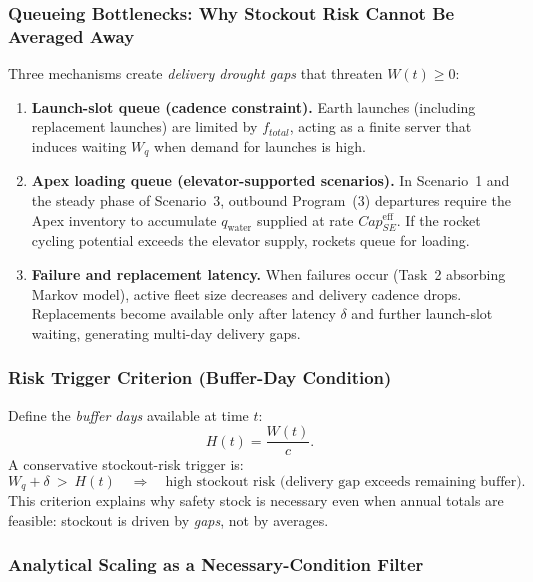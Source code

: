 ﻿\documentclass{mcmthesis}
\begin{document}
\subsubsection{Queueing Bottlenecks: Why Stockout Risk Cannot Be Averaged Away}
\label{sec:model3_bottleneck_opt}

Three mechanisms create \emph{delivery drought gaps} that threaten $W(t)\ge 0$:

\begin{enumerate}
\item \textbf{Launch-slot queue (cadence constraint).}
Earth launches (including replacement launches) are limited by $f_{total}$, acting as a finite server that induces
waiting $W_q$ when demand for launches is high.

\item \textbf{Apex loading queue (elevator-supported scenarios).}
In Scenario~1 and the steady phase of Scenario~3, outbound Program~(3) departures require the Apex inventory
to accumulate $q_{\text{water}}$ supplied at rate $Cap_{SE}^{\text{eff}}$. If the rocket cycling potential exceeds
the elevator supply, rockets queue for loading.

\item \textbf{Failure and replacement latency.}
When failures occur (Task~2 absorbing Markov model), active fleet size decreases and delivery cadence drops.
Replacements become available only after latency $\delta$ and further launch-slot waiting, generating multi-day
delivery gaps.
\end{enumerate}

\subsubsection{Risk Trigger Criterion (Buffer-Day Condition)}
\label{sec:model3_trigger_opt}

Define the \emph{buffer days} available at time $t$:
\begin{equation}
H(t)=\frac{W(t)}{c}.
\end{equation}
A conservative stockout-risk trigger is:
\begin{equation}
W_q + \delta \ >\ H(t)
\quad \Rightarrow \quad
\text{high stockout risk (delivery gap exceeds remaining buffer).}
\end{equation}
This criterion explains why safety stock is necessary even when annual totals are feasible:
stockout is driven by \emph{gaps}, not by averages.

\subsubsection{Analytical Scaling as a Necessary-Condition Filter}
\label{sec:model3_scaling_opt}
\end{document}
